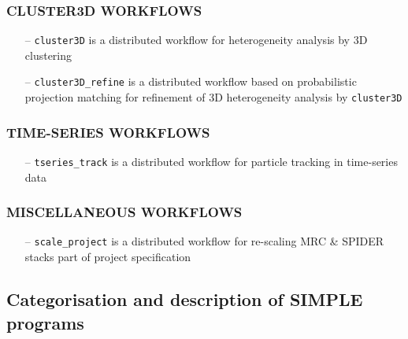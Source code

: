\documentclass[a4paper,11pt]{article}
\newcommand{\prgname}[1]{\textcolor{NavyBlue}{\texttt{#1}}}
\begin{document}
\subsubsection{CLUSTER3D WORKFLOWS}
\begin{itemize}
\item[--] \prgname{cluster3D} is a distributed workflow for heterogeneity analysis by 3D clustering
\item[--] \prgname{cluster3D\_refine} is a distributed workflow based on probabilistic projection matching for refinement of 3D heterogeneity analysis by \prgname{cluster3D}
\end{itemize}

\subsubsection{TIME-SERIES WORKFLOWS}
\begin{itemize}
\item[--] \prgname{tseries\_track} is a distributed workflow for particle tracking in time-series data
\end{itemize}

\subsubsection{MISCELLANEOUS WORKFLOWS}
\begin{itemize}
\item[--] \prgname{scale\_project} is a distributed workflow for re-scaling MRC \& SPIDER stacks part of project specification
\end{itemize}

\subsection{Categorisation and description of SIMPLE programs}
\end{document}
